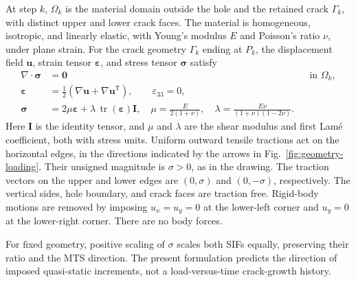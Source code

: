 \documentclass[pdflatex,sn-mathphys-num]{sn-jnl}
\begin{document}
At step $k$, $\Omega_k$ is the material domain outside the hole and the
retained crack $\Gamma_k$, with distinct upper and lower crack faces.
The material is homogeneous, isotropic, and linearly elastic,
with Young's modulus $E$ and Poisson's ratio $\nu$, under plane
strain. For the crack geometry $\Gamma_k$ ending at $P_k$, the
displacement field $\bm u$, strain tensor $\bm\varepsilon$, and stress
tensor $\bm\sigma$ satisfy
\begin{align}
 \nabla\!\cdot\bm{\sigma}&=\bm0 &&\text{in }\Omega_k,\label{eq:equilibrium}\\
 \bm{\varepsilon}&=\tfrac12(\nabla\bm u+\nabla\bm u^{\mathsf T}),\qquad
 \varepsilon_{33}=0,\label{eq:strain}\\
 \bm{\sigma}&=2\mu\bm{\varepsilon}
       +\lambda\,\operatorname{tr}(\bm{\varepsilon})\bm I,
 \quad \mu=\frac{E}{2(1+\nu)},\quad
 \lambda=\frac{E\nu}{(1+\nu)(1-2\nu)}.\label{eq:constitutive}
\end{align}
Here $\bm I$ is the identity tensor, and $\mu$ and $\lambda$ are the
shear modulus and first Lam\'e coefficient, both with stress units.
Uniform outward tensile tractions act on the horizontal edges, in the
directions indicated by the arrows in Fig.~\ref{fig:geometry-loading}.
Their unsigned magnitude is $\sigma>0$, as in the drawing. The traction
vectors on the upper and lower edges are $(0,\sigma)$ and
$(0,-\sigma)$, respectively. The vertical sides, hole boundary, and
crack faces are traction free. Rigid-body motions are removed by imposing
$u_x=u_y=0$ at the lower-left corner and $u_y=0$ at the lower-right
corner. There are no body forces.

For fixed geometry, positive scaling of $\sigma$ scales both SIFs
equally, preserving their ratio and the MTS direction. The present
formulation predicts the direction of imposed quasi-static increments,
not a load-versus-time crack-growth history.
\end{document}
